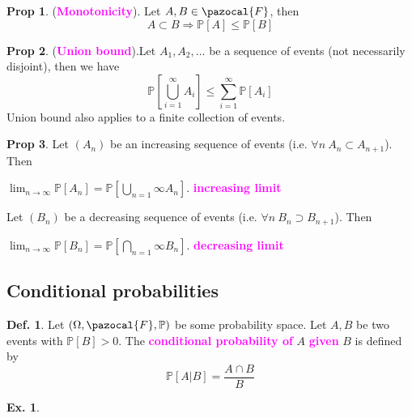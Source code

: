 \documentclass[8pt,a4paper,landscape]{article}
\theoremstyle{definition}
\newtheorem{definition}{Def.}[section]
\theoremstyle{example}
\newtheorem{example}{Ex.}[section]
\theoremstyle{intuition}
\theoremstyle{definition}
\newtheorem{proposition}{Prop}[section]
\newcommand{\Fb}{\pazocal{F}}
\newcommand{\mydef}[1]{\textcolor{magenta}{\textbf{#1}}}
\newcommand{\prob}[1]{\mathbb{P}\left[ #1 \right]}
\begin{document}
\begin{multicols}{3}
				\begin{proposition}
					(\mydef{Monotonicity}). Let $A, B \in \Fb$, then
					$$
						A \subset B \Rightarrow \prob{A} \leq \prob{B}
					$$
				\end{proposition}
				
				\begin{proposition}
					(\mydef{Union bound}).Let $A_1, A_2, \ldots$ be a sequence of events (not necessarily disjoint), then we have
					$$
						\prob{\bigcup\limits_{i=1}^{\infty} A_i} \leq \sum_{i=1}^{\infty}\prob{A_i}
					$$
					Union bound also applies to a finite collection of events.
				\end{proposition}
				
				\begin{proposition}
					Let $(A_n)$ be an increasing sequence of events (i.e. $\forall n \ A_n \subset A_{n+1}$). Then
					\begin{center}
						$\lim_{n \rightarrow \infty} \prob{A_n} = \prob{\bigcup\limits_{n=1}{\infty} A_n}$. \mydef{increasing limit}
					\end{center}
					Let $(B_n)$ be a decreasing sequence of events (i.e. $\forall n \ B_n \supset B_{n+1}$). Then
					\begin{center}
						$\lim_{n \rightarrow \infty} \prob{B_n} = \prob{\bigcap\limits_{n=1}{\infty} B_n}$. \mydef{decreasing limit}
					\end{center}
				\end{proposition}
				
				
			\subsection{Conditional probabilities}
			
				\begin{definition}
					Let $(\Omega, \Fb, \mathbb{P})$ be some probability space. Let $A, B$ be two events with $\prob{B} > 0$. The \mydef{conditional probability of} $A$ \mydef{given} $B$ is defined by
					$$
						\prob{A \lvert B} = \frac{A \cap B}{B}
					$$
				\end{definition}
				
				\begin{example}
				\end{example}

				
	
	
\end{multicols}	
\end{document}
